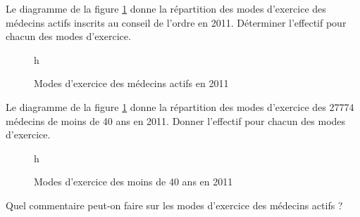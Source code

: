 \begin{questions}
	
	\question Le diagramme de la figure \ref{fig:mode_exercice1} donne la répartition des modes d'exercice des médecins actifs inscrits au conseil de l'ordre en 2011. Déterminer l'effectif pour chacun des modes d'exercice.
	
	\begin{figure}{h}
		\begin{center}
			\caption{Modes d'exercice des médecins actifs en 2011}
			\label{fig:mode_exercice1}
		\end{center}
	\end{figure}
	
	\question Le diagramme de la figure \ref{fig:mode_exercice1} donne la répartition des modes d'exercice des \num{27774} médecins de moins de 40 ans en 2011. Donner l'effectif pour chacun des modes d'exercice.
	
	\begin{figure}{h}
		\begin{center}
			\caption{Modes d'exercice des moins de 40 ans en 2011}
			\label{fig:mode_exercice2}
		\end{center}
	\end{figure}
	
	
	\question Quel commentaire peut-on faire sur les modes d'exercice des médecins actifs ?
\end{questions}